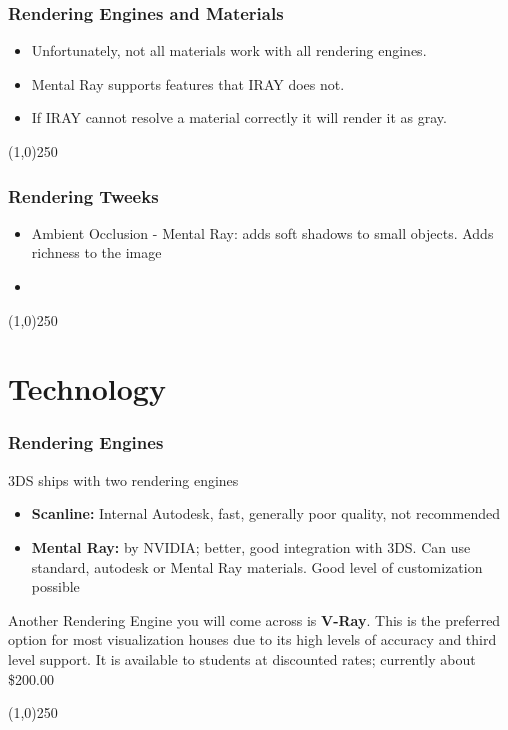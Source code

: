 \begin{frame}
\frametitle{Rendering Engines and Materials}
\begin{itemize}
	\item Unfortunately, not all materials work with all rendering engines.
	\item Mental Ray supports features that IRAY does not.
	\item If IRAY cannot resolve a material correctly it will render it as gray.
\end{itemize}
\end{frame}
\begin{center}\line(1,0){250}\end{center}


\begin{frame}
\frametitle{Rendering Tweeks}
\begin{itemize}
	\item Ambient Occlusion - Mental Ray: adds soft shadows to small objects.  Adds richness to the image
	\item 
\end{itemize}
\end{frame}
\begin{center}\line(1,0){250}\end{center}





\section{Technology}


\begin{frame}
\frametitle{Rendering Engines}
3DS ships with two rendering engines
\begin{itemize}
	\item \textbf{Scanline:} Internal Autodesk, fast, generally poor quality, not recommended
	\item \textbf{Mental Ray:} by NVIDIA; better, good integration with 3DS.  Can use standard, autodesk or Mental Ray materials.  Good level of customization possible
\end{itemize}
Another Rendering Engine you will come across is \textbf{V-Ray}. This is the preferred option for most visualization houses due to its high levels of accuracy and third level support.  It is available to students at discounted rates; currently about \$200.00
\end{frame}
\begin{center}\line(1,0){250}\end{center}



